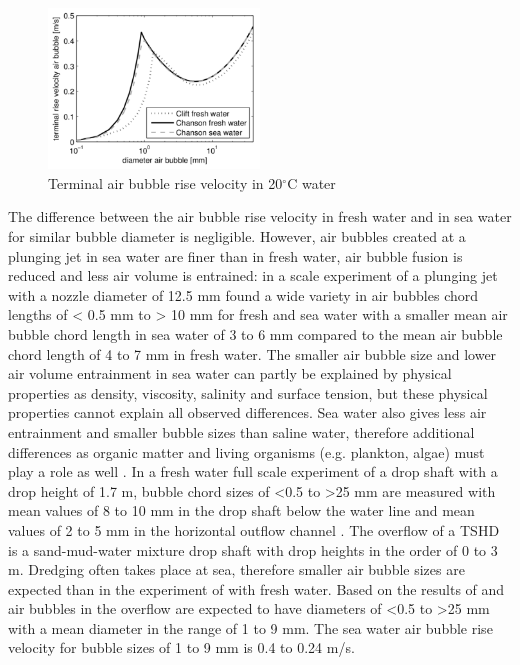 \begin{figure}[ht!]
    \centering
    \includegraphics[width = 0.5\textwidth]{Images/bubble_rise.png}
    \caption{Terminal air bubble rise velocity in 20$^{\circ}$C water}
    \label{fig:bubble_rise}
\end{figure}

\noindent The difference between the air bubble rise velocity in fresh water and in sea water for similar bubble diameter is negligible. However, air bubbles created at a plunging jet in sea water are finer than in fresh water, air bubble fusion is reduced and less air volume is entrained: in a scale experiment of a plunging jet with a nozzle diameter of 12.5 mm \cite{Chanson2006+} found a wide variety in air bubbles chord lengths of < 0.5 mm to > 10 mm for fresh and sea water with a smaller mean air bubble chord length in sea water of 3 to 6 mm compared to the mean air bubble chord length of 4 to 7 mm in fresh water. \newline 
\noindent The smaller air bubble size and lower air volume entrainment in sea water can partly be explained by physical properties as density, viscosity, salinity and surface tension, but these physical properties cannot explain all observed differences. Sea water also gives less air entrainment and smaller bubble sizes than saline water, therefore additional differences as organic matter and living organisms (e.g. plankton, algae) must play a role as well \cite{Chanson2006+}. In a fresh water full scale experiment of a drop shaft with a drop height of 1.7 m, bubble chord sizes of <0.5 to >25 mm are measured with mean values of 8 to 10 mm in the drop shaft below the water line and mean values of 2 to 5 mm in the horizontal outflow channel \citep{Chanson}. \newline
The overflow of a TSHD is a sand-mud-water mixture drop shaft with drop heights in the order of 0 to 3 m. Dredging often takes place at sea, therefore smaller air bubble sizes are expected than in the experiment of \cite{Chanson} with fresh water. Based on the results of \cite{Chanson2006+} and \cite{Chanson} air bubbles in the overflow are expected to have diameters of <0.5 to >25 mm with a mean diameter in the range of 1 to 9 mm. The sea water air bubble rise velocity for bubble sizes of 1 to 9 mm is 0.4 to 0.24 m/s. \newline

